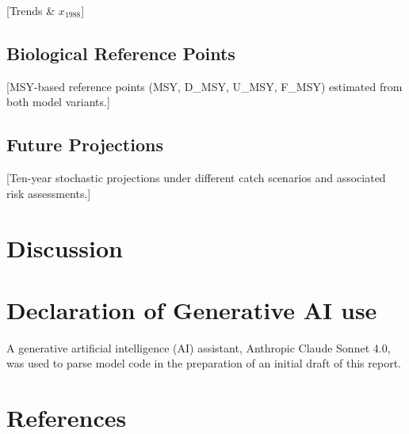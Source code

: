 \documentclass[
  11pt,
]{SCreport}
\begin{document}
{[}Trends \& \(x_{1988}\){]}

\subsection{Biological Reference Points}\label{sec-reference-points}

{[}MSY-based reference points (MSY, D\_MSY, U\_MSY, F\_MSY) estimated
from both model variants.{]}

\subsection{Future Projections}\label{sec-projections}

{[}Ten-year stochastic projections under different catch scenarios and
associated risk assessments.{]}

\section{Discussion}\label{sec-discussion}

\section{Declaration of Generative AI use}\label{sec-ai-declaration}

A generative artificial intelligence (AI) assistant, Anthropic Claude
Sonnet 4.0, was used to parse model code in the preparation of an
initial draft of this report.

\section{References}\label{sec-refs}
\end{document}
